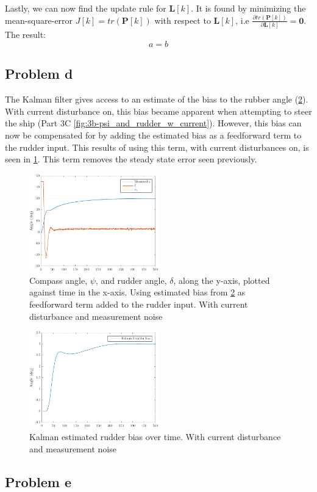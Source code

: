Lastly, we can now find the update rule for $\bm{L}[k]$. It is found by minimizing the mean-square-error $J[k] = tr(\bm{P}[k])$ with respect to $\bm{L}[k]$, i.e $\frac{\partial tr(\bm{P}[k])}{\partial\bm{L}[k]} = \bm{0}$. The result:
\begin{equation}
a = b
\end{equation}

\subsection{Problem d}
The Kalman filter gives access to an estimate of the bias to the rubber angle (\cref{fig:5d-estimated_rudder_bias}).  With current disturbance on, this bias became apparent when attempting to steer the ship (Part 3C \cref{fig:3b-psi_and_rudder_w_current}).  However, this bias can now be compensated for by adding the estimated bias as a feedforward term to the rudder input.  This results of using this term, with current disturbances on, is seen in \cref{fig:5d-psi_and_rudder}.  This term removes the steady state error seen previously.

\begin{figure}[ht]
    \centering
    \includegraphics[width=0.5\textwidth]{images/5d-psi_and_rudder}
    \caption{Compass angle, $\psi$, and rudder angle, $\delta$, along the y-axis, plotted against time in the x-axis. Using estimated bias from \cref{fig:5d-estimated_rudder_bias} as feedforward term added to the rudder input. With current disturbance and measurement noise}
    \label{fig:5d-psi_and_rudder}
\end{figure}

\begin{figure}[ht]
    \centering
    \includegraphics[width=0.5\textwidth]{images/5d-estimated_rudder_bias}
    \caption{Kalman estimated rudder bias over time. With current disturbance and measurement noise}
    \label{fig:5d-estimated_rudder_bias}
\end{figure}

\subsection{Problem e}
